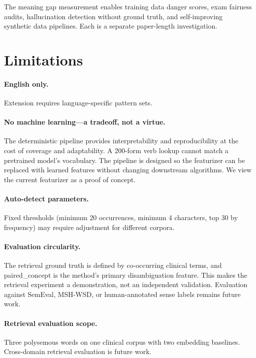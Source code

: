 \documentclass[11pt,a4paper]{article}
\begin{document}
The meaning gap measurement enables training data danger scores, exam fairness audits, hallucination detection without ground truth, and self-improving synthetic data pipelines. Each is a separate paper-length investigation.

\section{Limitations}
\label{sec:limitations}

\paragraph{English only.} Extension requires language-specific pattern sets.

\paragraph{No machine learning---a tradeoff, not a virtue.} The deterministic pipeline provides interpretability and reproducibility at the cost of coverage and adaptability. A 200-form verb lookup cannot match a pretrained model's vocabulary. The pipeline is designed so the featurizer can be replaced with learned features without changing downstream algorithms. We view the current featurizer as a proof of concept.

\paragraph{Auto-detect parameters.} Fixed thresholds (minimum 20 occurrences, minimum 4 characters, top 30 by frequency) may require adjustment for different corpora.

\paragraph{Evaluation circularity.} The retrieval ground truth is defined by co-occurring clinical terms, and paired\_concept is the method's primary disambiguation feature. This makes the retrieval experiment a demonstration, not an independent validation. Evaluation against SemEval, MSH-WSD, or human-annotated sense labels remains future work.

\paragraph{Retrieval evaluation scope.} Three polysemous words on one clinical corpus with two embedding baselines. Cross-domain retrieval evaluation is future work.
\end{document}
